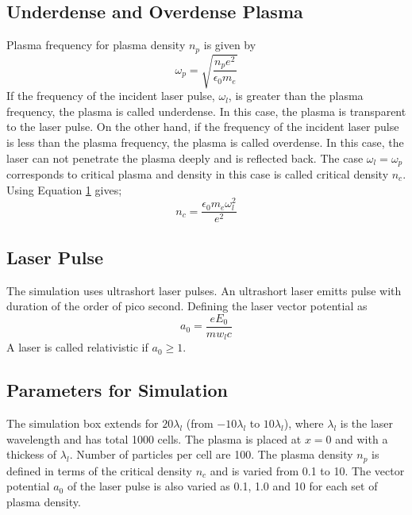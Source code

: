 \documentclass[12pt]{article}
\newenvironment{changemargin}[2]{%
\begin{list}{}{%
\setlength{\topsep}{0pt}%
\setlength{\leftmargin}{#1}%
\setlength{\rightmargin}{#2}%
\setlength{\listparindent}{\parindent}%
\setlength{\itemindent}{\parindent}%
\setlength{\parsep}{\parskip}%
}%
\item[]}{\end{list}}
\begin{document}
\begin{changemargin}{-3cm}{-3cm}
    \subsection{Underdense and Overdense Plasma}
    Plasma frequency for plasma density $n_p$ is given by\cite{chen}
    \begin{equation}\label{plasma-frequency}
        \omega_p = \sqrt{\frac{n_p e^2}{\epsilon_0 m_e}}
    \end{equation}
    If the frequency of the incident laser pulse, $\omega_l$, is greater than the plasma frequency, the plasma is called underdense. In this case, the plasma is transparent to the laser pulse. On the other hand, if the frequency of the incident laser pulse is less than the plasma frequency, the plasma is called overdense. In this case, the laser can not penetrate the plasma deeply and is reflected back. The case $\omega_l = \omega_p$ corresponds to critical plasma and density in this case is called critical density $n_c$. Using Equation \hyperref[plasma-frequency]{1} gives;
    \begin{equation}\label{critical-density}
        n_c = \frac{\epsilon_0 m_e \omega_l^2}{e^2}
    \end{equation}
    \subsection{Laser Pulse}
    The simulation uses ultrashort laser pulses. An ultrashort laser emitts pulse with duration of the order of pico second. Defining the laser vector potential as $$ a_0 = \frac{eE_0}{m w_l c}$$
    A laser is called relativistic if $a_0 \ge 1$.

    \subsection{Parameters for Simulation}
    The simulation box extends for $20 \lambda _l$ (from $-10 \lambda _l$ to $10 \lambda _l$), where $\lambda_l$ is the laser wavelength and has total 1000 cells. The plasma is placed at $x=0$ and with a thickess of $\lambda_l$. Number of particles per cell are 100.  The plasma density $n_p$ is defined in terms of the critical density $n_c$ and is varied from 0.1 to 10. The vector potential $a_0$ of the laser pulse is also varied as 0.1, 1.0 and 10 for each set of plasma density.


\end{changemargin}
\end{document}
